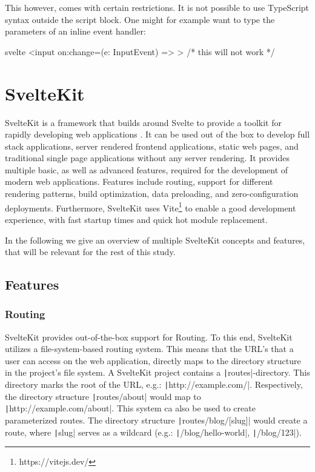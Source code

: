 This however, comes with certain restrictions. It is not possible to use TypeScript syntax outside the script block. One might for example want to type the parameters of an inline event handler:

\begin{myminted}{svelte}{}
<input on:change={(e: InputEvent) => {}}> /* this will not work */ 
\end{myminted}

\section{SvelteKit}
\label{sec:sveltekit}

SvelteKit is a framework that builds around Svelte to provide a toolkit for rapidly developing web applications \cite{noauthor_sveltekit_nodate}. It can be used out of the box to develop full stack applications, server rendered frontend applications, static web pages, and traditional single page applications without any server rendering. It provides multiple basic, as well as advanced features, required for the development of modern web applications. Features include routing, support for different rendering patterns, build optimization, data preloading, and zero-configuration deployments. Furthermore, SvelteKit uses Vite\footnote{https://vitejs.dev/} to enable a good development experience, with fast startup times and quick hot module replacement.

In the following we give an overview of multiple SvelteKit concepts and features, that will be relevant for the rest of this study. 


\subsection{Features}


\subsubsection{Routing}
\label{sec:sveltekit-routing}

SvelteKit provides out-of-the-box support for Routing. To this end, SvelteKit utilizes a file-system-based routing system. This means that the URL's that a user can access on the web application, directly maps to the directory structure in the project's file system. A SvelteKit project contains a \texttt|routes|-directory. This directory marks the root of the URL, e.g.: \texttt|http://example.com/|. Respectively, the directory structure \texttt|routes/about| would map to \texttt|http://example.com/about|. This system ca also be used to create parameterized routes. The directory structure \texttt|routes/blog/[slug]| would create a route, where \texttt|slug| serves as a wildcard (e.g.: \texttt|/blog/hello-world|, \texttt|/blog/123|).

